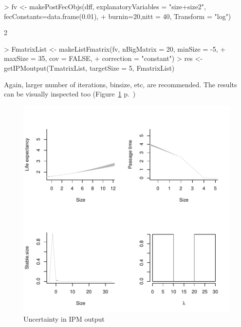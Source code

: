 \documentclass{article}
\begin{document}
\begin{Schunk}
\begin{Sinput}
> fv <- makePostFecObjs(dff, explanatoryVariables = "size+size2", fecConstants=data.frame(0.01), 
+                       burnin=20,nitt = 40, Transform = "log")
\end{Sinput}
\begin{Soutput}
[1] 2
\end{Soutput}
\begin{Sinput}
> FmatrixList <- makeListFmatrix(fv, nBigMatrix = 20, minSize = -5, 
+                                maxSize = 35, cov = FALSE,
+                                correction = "constant")
> res <- getIPMoutput(TmatrixList, targetSize = 5, FmatrixList)
\end{Sinput}
\end{Schunk}

Again, larger number of iterations, binsize, etc, are recommended. The results can be visually inspected too (Figure~\ref{fig:seven} p.~\pageref{fig:seven})
\begin{figure}
\begin{center}
\includegraphics{IPMpack_Vignette-fig7}

\end{center}
\caption{Uncertainty in IPM output}
\label{fig:seven}
\end{figure}
\end{document}
